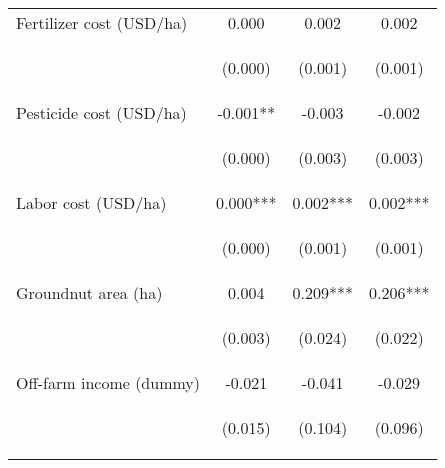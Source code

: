 \begin{center}
\begin{tabular}{lccc}
Fertilizer cost (USD/ha) & 0.000 & 0.002 & 0.002 \\
\vspace{4pt} & \begin{footnotesize}(0.000)\end{footnotesize} & \begin{footnotesize}(0.001)\end{footnotesize} & \begin{footnotesize}(0.001)\end{footnotesize} \\
Pesticide cost (USD/ha) & -0.001** & -0.003 & -0.002 \\
\vspace{4pt} & \begin{footnotesize}(0.000)\end{footnotesize} & \begin{footnotesize}(0.003)\end{footnotesize} & \begin{footnotesize}(0.003)\end{footnotesize} \\
Labor cost (USD/ha) & 0.000*** & 0.002*** & 0.002*** \\
\vspace{4pt} & \begin{footnotesize}(0.000)\end{footnotesize} & \begin{footnotesize}(0.001)\end{footnotesize} & \begin{footnotesize}(0.001)\end{footnotesize} \\
Groundnut area (ha) & 0.004 & 0.209*** & 0.206*** \\
\vspace{4pt} & \begin{footnotesize}(0.003)\end{footnotesize} & \begin{footnotesize}(0.024)\end{footnotesize} & \begin{footnotesize}(0.022)\end{footnotesize} \\
Off-farm income (dummy) & -0.021 & -0.041 & -0.029 \\
\vspace{4pt} & \begin{footnotesize}(0.015)\end{footnotesize} & \begin{footnotesize}(0.104)\end{footnotesize} & \begin{footnotesize}(0.096)\end{footnotesize} \\

\end{tabular}
\end{center}
